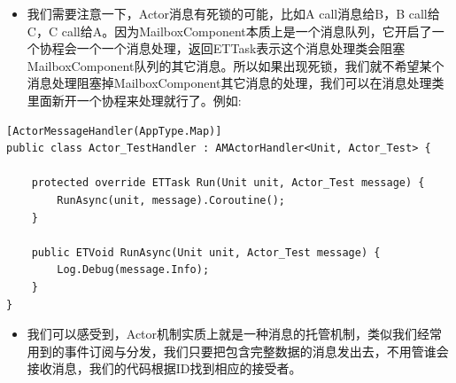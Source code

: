 \documentclass[9pt, b5paper]{article}
\begin{document}
\begin{itemize}
\item 我们需要注意一下，Actor消息有死锁的可能，比如A call消息给B，B call给C，C call给A。因为MailboxComponent本质上是一个消息队列，它开启了一个协程会一个一个消息处理，返回ETTask表示这个消息处理类会阻塞MailboxComponent队列的其它消息。所以如果出现死锁，我们就不希望某个消息处理阻塞掉MailboxComponent其它消息的处理，我们可以在消息处理类里面新开一个协程来处理就行了。例如:
\end{itemize}
\begin{verbatim}
[ActorMessageHandler(AppType.Map)]
public class Actor_TestHandler : AMActorHandler<Unit, Actor_Test> {

    protected override ETTask Run(Unit unit, Actor_Test message) {
        RunAsync(unit, message).Coroutine();
    }

    public ETVoid RunAsync(Unit unit, Actor_Test message) {
        Log.Debug(message.Info);
    }
}
\end{verbatim}
\begin{itemize}
\item 我们可以感受到，Actor机制实质上就是一种消息的托管机制，类似我们经常用到的事件订阅与分发，我们只要把包含完整数据的消息发出去，不用管谁会接收消息，我们的代码根据ID找到相应的接受者。
\end{itemize}
\end{document}

